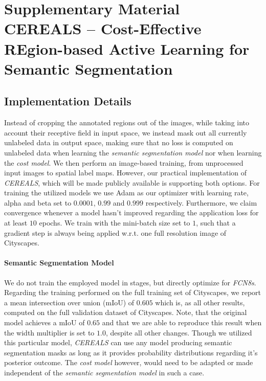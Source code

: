 \documentclass{bmvc2k}
\begin{document}
\clearpage

\appendix

\section{Supplementary Material \newline CEREALS -- Cost-Effective REgion-based Active Learning for Semantic Segmentation}

\subsection{Implementation Details}
\label{appendix:impl_details}

Instead of cropping the annotated regions out of the images, while taking into account their receptive field in input space, we instead mask out all currently unlabeled data in output space, making sure that no loss is computed on unlabeled data when learning the \textit{semantic segmentation model} nor when learning the \textit{cost model}. We then perform an image-based training, from unprocessed input images to spatial label maps. However, our practical implementation of \textit{CEREALS}, which will be made publicly available is supporting both options. For training the utilized models we use Adam as our optimizer with learning rate, alpha and beta set to $0.0001$, $0.99$ and $0.999$ respectively. Furthermore, we claim convergence whenever a model hasn't improved regarding the application loss for at least $10$ epochs. We train with the mini-batch size set to $1$, such that a gradient step is always being applied w.r.t. one full resolution image of Cityscapes.

\paragraph{Semantic Segmentation Model}
We do not train the employed model in stages, but directly optimize for \textit{FCN8s}. Regarding the training performed on the full training set of Cityscapes, we report a mean intersection over union (mIoU) of $0.605$ which is, as all other results, computed on the full validation dataset of Cityscapes. Note, that the original model achieves a mIoU of $0.65$ and that we are able to reproduce this result when the width multiplier is set to $1.0$, despite all other changes. Though we utilized this particular model, \textit{CEREALS} can use any model producing semantic segmentation masks as long as it provides probability distributions regarding it's posterior outcome. The \textit{cost model} however, would need to be adapted or made independent of the \textit{semantic segmentation model} in such a case. 
\end{document}

